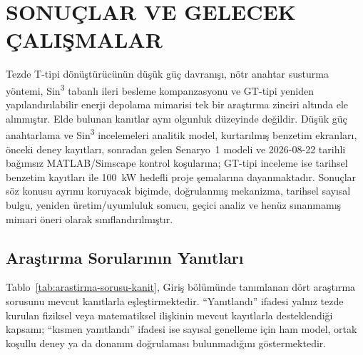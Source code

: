\chapter{SONUÇLAR VE GELECEK ÇALIŞMALAR}
\label{chap:sonuc}

Tezde T-tipi dönüştürücünün düşük güç davranışı, nötr anahtar susturma yöntemi, Sin\textsuperscript{3} tabanlı ileri besleme kompanzasyonu ve GT-tipi yeniden yapılandırılabilir enerji depolama mimarisi tek bir araştırma zinciri altında ele alınmıştır. Elde bulunan kanıtlar aynı olgunluk düzeyinde değildir. Düşük güç anahtarlama ve Sin\textsuperscript{3} incelemeleri analitik model, kurtarılmış benzetim ekranları, önceki deney kayıtları, sonradan gelen Senaryo~1 modeli ve 2026-08-22 tarihli bağımsız MATLAB/Simscape kontrol koşularına; GT-tipi inceleme ise tarihsel benzetim kayıtları ile \SI{100}{\kilo\watt} hedefli proje şemalarına dayanmaktadır. Sonuçlar söz konusu ayrımı koruyacak biçimde, doğrulanmış mekanizma, tarihsel sayısal bulgu, yeniden üretim/uyumluluk sonucu, geçici analiz ve henüz sınanmamış mimari öneri olarak sınıflandırılmıştır.

\section{Araştırma Sorularının Yanıtları}

Tablo~\ref{tab:arastirma-sorusu-kanit}, Giriş bölümünde tanımlanan dört araştırma sorusunu mevcut kanıtlarla eşleştirmektedir. ``Yanıtlandı'' ifadesi yalnız tezde kurulan fiziksel veya matematiksel ilişkinin mevcut kayıtlarla desteklendiği kapsamı; ``kısmen yanıtlandı'' ifadesi ise sayısal genelleme için ham model, ortak koşullu deney ya da donanım doğrulaması bulunmadığını göstermektedir.

